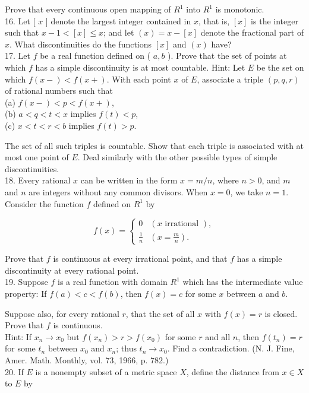 \documentclass[10pt]{article}
\begin{document}
Prove that every continuous open mapping of $R^{1}$ into $R^{1}$ is monotonic.\\
16. Let [ $x$ ] denote the largest integer contained in $x$, that is, $[x]$ is the integer such that $x-1<[x] \leq x$; and let $(x)=x-[x]$ denote the fractional part of $x$. What discontinuities do the functions $[x]$ and $(x)$ have?\\
17. Let $f$ be a real function defined on ( $a, b$ ). Prove that the set of points at which $f$ has a simple discontinuity is at most countable. Hint: Let $E$ be the set on which $f(x-)<f(x+)$. With each point $x$ of $E$, associate a triple $(p, q, r)$ of rational numbers such that\\
(a) $f(x-)<p<f(x+)$,\\
(b) $a<q<t<x$ implies $f(t)<p$,\\
(c) $x<t<r<b$ implies $f(t)>p$.

The set of all such triples is countable. Show that each triple is associated with at most one point of $E$. Deal similarly with the other possible types of simple discontinuities.\\
18. Every rational $x$ can be written in the form $x=m / n$, where $n>0$, and $m$ and $n$ are integers without any common divisors. When $x=0$, we take $n=1$. Consider the function $f$ defined on $R^{1}$ by

$$
f(x)=\left\{\begin{array}{cc}
0 & (x \text { irrational }), \\
\frac{1}{n} & \left(x=\frac{m}{n}\right) .
\end{array}\right.
$$

Prove that $f$ is continuous at every irrational point, and that $f$ has a simple discontinuity at every rational point.\\
19. Suppose $f$ is a real function with domain $R^{1}$ which has the intermediate value property: If $f(a)<c<f(b)$, then $f(x)=c$ for some $x$ between $a$ and $b$.

Suppose also, for every rational $r$, that the set of all $x$ with $f(x)=r$ is closed.\\
Prove that $f$ is continuous.\\
Hint: If $x_{n} \rightarrow x_{0}$ but $f\left(x_{n}\right)>r>f\left(x_{0}\right)$ for some $r$ and all $n$, then $f\left(t_{n}\right)=r$ for some $t_{n}$ between $x_{0}$ and $x_{n}$; thus $t_{n} \rightarrow x_{0}$. Find a contradiction. (N. J. Fine, Amer. Math. Monthly, vol. 73, 1966, p. 782.)\\
20. If $E$ is a nonempty subset of a metric space $X$, define the distance from $x \in X$ to $E$ by
\end{document}
